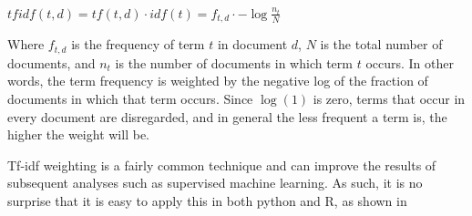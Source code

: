 $tfidf(t,d)=tf(t,d)\cdot idf(t)=f_{t,d}\cdot -\log \frac{n_t}{N}$

Where $f_{t,d}$ is the frequency of term $t$ in document $d$, $N$ is the total number of documents, and $n_t$ is the number of documents in which term $t$ occurs. In other words, the term frequency is weighted by the negative log of the fraction of documents in which that term occurs. Since $\log(1)$ is zero, terms that occur in every document are disregarded, and in general the less frequent a term is, the higher the weight will be. 

Tf-idf weighting is a fairly common technique and can improve the results of subsequent analyses such as supervised machine learning.
As such, it is no surprise that it is easy to apply this in both python and R, as shown in 


